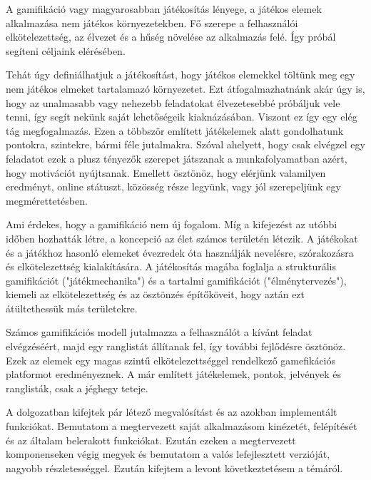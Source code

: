 
A gamifikáció vagy magyarosabban játékosítás lényege, a játékos elemek alkalmazása nem játékos környezetekben. Fő szerepe a felhasználói elkötelezettség, az élvezet és a hűség növelése az alkalmazás felé. Így próbál segíteni céljaink elérésében. \newline

Tehát úgy definiálhatjuk a játékosítást, hogy játékos elemekkel töltünk meg egy nem játékos elmeket tartalamazó környezetet. Ezt átfogalmazhatnánk akár úgy is, hogy az unalmasabb vagy nehezebb feladatokat élvezetesebbé próbáljuk vele tenni, így segít nekünk saját lehetőségeik kiaknázásában. Viszont ez így egy elég tág megfogalmazás. Ezen a többször említett játékelemek alatt gondolhatunk pontokra, szintekre, bármi féle jutalmakra. Szóval ahelyett, hogy csak elvégzel egy feladatot ezek a plusz tényezők szerepet játszanak a munkafolyamatban azért, hogy motivációt nyújtsanak. Emellett ösztönöz, hogy elérjünk valamilyen eredményt, online státuszt, közösség része legyünk, vagy jól szerepeljünk egy megmérettetésben. \newline

Ami érdekes, hogy a gamifikáció nem új fogalom. Míg a kifejezést az utóbbi időben hozhatták létre, a koncepció az élet számos területén létezik. A játékokat és a játékhoz hasonló elemeket évezredek óta használják nevelésre, szórakozásra és elkötelezettség kialakítására. A játékosítás magába foglalja a strukturális gamifikációt ("játékmechanika") és a tartalmi gamifikációt ("élménytervezés"), kiemeli az elkötelezettség és az ösztönzés építőköveit, hogy aztán ezt átültethessük más területekre. \newline

Számos gamifikációs modell jutalmazza a felhasználót a kívánt feladat elvégzéséért, majd egy ranglistát állítanak fel, így további fejlődésre ösztönöz. Ezek az elemek egy magas szintű elkötelezettséggel rendelkező gamefikációs platformot eredményeznek.
A már említett játékelemek, pontok, jelvények és ranglisták, csak a jéghegy teteje. \newline

A dolgozatban kifejtek pár létező megvalósítást és az azokban implementált funkciókat. Bemutatom a megtervezett saját alkalmazásom kinézetét, felépítését és az általam belerakott funkciókat. Ezután ezeken a megtervezett komponenseken végig megyek és bemutatom a valós lefejlesztett verzióját, nagyobb részletességgel. Ezután kifejtem a levont következtetésem a témáról.